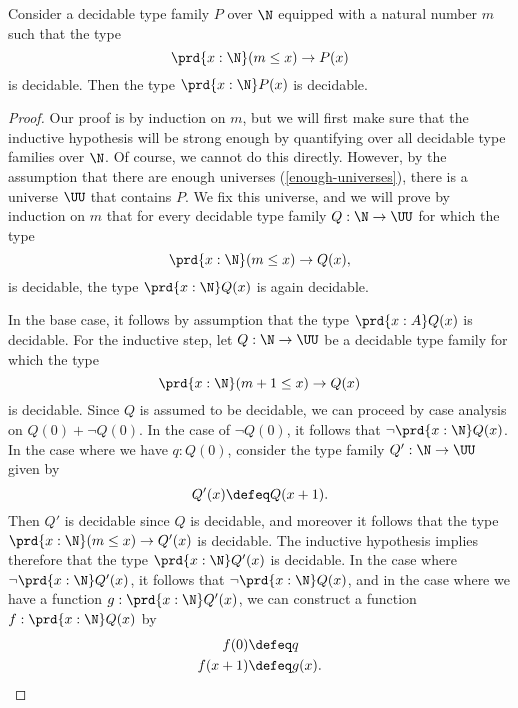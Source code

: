 \begin{prp}\label{prp:is-decidable-pi-type}
  Consider a decidable type family $P$ over $\N$ equipped with a natural number $m$ such that the type
  \begin{equation*}
    \prd{x:\N}(m\leq x)\to P(x)
  \end{equation*}
  is decidable. Then the type $\prd{x:\N}P(x)$ is decidable. 
\end{prp}

\begin{proof}
  Our proof is by induction on $m$, but we will first make sure that the inductive hypothesis will be strong enough by quantifying over all decidable type families over $\N$. Of course, we cannot do this directly. However, by the assumption that there are enough universes (\cref{enough-universes}), there is a universe $\UU$ that contains $P$. We fix this universe, and we will prove by induction on $m$ that for every decidable type family $Q:\N\to\UU$ for which the type
  \begin{equation*}
    \prd{x:\N}(m\leq x)\to Q(x),
  \end{equation*}
  is decidable, the type $\prd{x:\N}Q(x)$ is again decidable.

  In the base case, it follows by assumption that the type $\prd{x:A}Q(x)$ is decidable. For the inductive step, let $Q:\N\to\UU$ be a decidable type family for which the type
  \begin{equation*}
    \prd{x:\N}(m+1\leq x)\to Q(x)
  \end{equation*}
  is decidable. Since $Q$ is assumed to be decidable, we can proceed by case analysis on $Q(0)+\neg Q(0)$. In the case of $\neg Q(0)$, it follows that $\neg \prd{x:\N}Q(x)$. In the case where we have $q:Q(0)$, consider the type family $Q':\N\to\UU$ given by
  \begin{equation*}
    Q'(x)\defeq Q(x+1).
  \end{equation*}
  Then $Q'$ is decidable since $Q$ is decidable, and moreover it follows that the type $\prd{x:\N} ({m\leq x})\to Q'(x)$ is decidable. The inductive hypothesis implies therefore that the type $\prd{x:\N}Q'(x)$ is decidable. In the case where $\neg\prd{x:\N}Q'(x)$, it follows that $\neg\prd{x:\N}Q(x)$, and in the case where we have a function $g:\prd{x:\N}Q'(x)$, we can construct a function $f:\prd{x:\N}Q(x)$ by
  \begin{align*}
    f(0) & \defeq q \\
    f(x+1) & \defeq g(x)\qedhere.
  \end{align*}
\end{proof}


